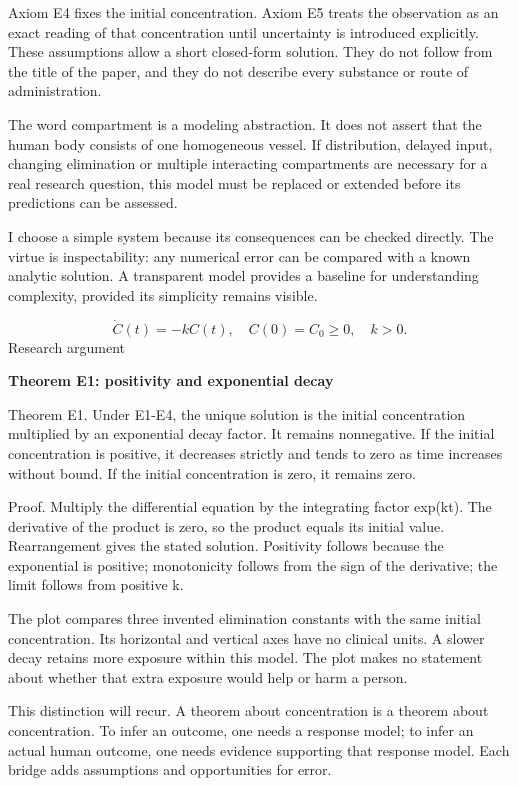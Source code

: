\documentclass[10pt]{article}
\begin{document}
Axiom E4 fixes the initial concentration. Axiom E5 treats the observation as an exact reading of that concentration until uncertainty is introduced explicitly. These assumptions allow a short closed-form solution. They do not follow from the title of the paper, and they do not describe every substance or route of administration.\par
The word compartment is a modeling abstraction. It does not assert that the human body consists of one homogeneous vessel. If distribution, delayed input, changing elimination or multiple interacting compartments are necessary for a real research question, this model must be replaced or extended before its predictions can be assessed.\par
I choose a simple system because its consequences can be checked directly. The virtue is inspectability: any numerical error can be compared with a known analytic solution. A transparent model provides a baseline for understanding complexity, provided its simplicity remains visible.\par
\[\dot C(t)=-kC(t),\quad C(0)=C_0\geq0,\quad k>0.\]
\clearpage
{\small\color{accent}Research argument}\par
{\LARGE\bfseries\color{ink}Theorem E1: positivity and exponential decay}\par\vspace{7pt}
Theorem E1. Under E1-E4, the unique solution is the initial concentration multiplied by an exponential decay factor. It remains nonnegative. If the initial concentration is positive, it decreases strictly and tends to zero as time increases without bound. If the initial concentration is zero, it remains zero.\par
Proof. Multiply the differential equation by the integrating factor exp(kt). The derivative of the product is zero, so the product equals its initial value. Rearrangement gives the stated solution. Positivity follows because the exponential is positive; monotonicity follows from the sign of the derivative; the limit follows from positive k.\par
The plot compares three invented elimination constants with the same initial concentration. Its horizontal and vertical axes have no clinical units. A slower decay retains more exposure within this model. The plot makes no statement about whether that extra exposure would help or harm a person.\par
This distinction will recur. A theorem about concentration is a theorem about concentration. To infer an outcome, one needs a response model; to infer an actual human outcome, one needs evidence supporting that response model. Each bridge adds assumptions and opportunities for error.\par
\end{document}
